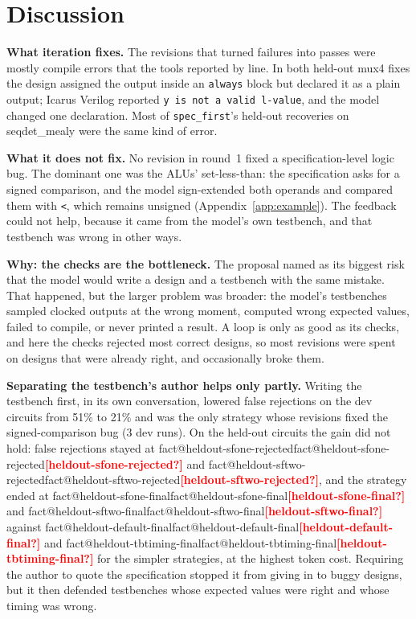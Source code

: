 \documentclass[11pt,a4paper]{article}
\makeatletter
\newcommand{\fact}[1]{\ifcsname fact@#1\endcsname\csname fact@#1\endcsname\else\textcolor{red}{\textbf{[#1?]}}\fi}
\makeatother
\begin{document}
\section{Discussion}\label{sec:discussion}

\textbf{What iteration fixes.} The revisions that turned failures into passes were mostly compile errors that the
tools reported by line. In both held-out mux4 fixes the design assigned the output inside an \texttt{always} block
but declared it as a plain output; Icarus Verilog reported \texttt{y is not a valid l-value}, and the model changed
one declaration. Most of \texttt{spec\_first}'s held-out recoveries on seqdet\_mealy were the same kind of error.

\textbf{What it does not fix.} No revision in round~1 fixed a specification-level logic bug. The dominant one was the
ALUs' set-less-than: the specification asks for a signed comparison, and the model sign-extended both operands and
compared them with \texttt{<}, which remains unsigned (Appendix~\ref{app:example}). The feedback could not help,
because it came from the model's own testbench, and that testbench was wrong in other ways.

\textbf{Why: the checks are the bottleneck.} The proposal named as its biggest risk that the model would write a
design and a testbench with the same mistake. That happened, but the larger problem was broader: the model's
testbenches sampled clocked outputs at the wrong moment, computed wrong expected values, failed to compile, or never
printed a result. A loop is only as good as its checks, and here the checks rejected most correct designs, so most
revisions were spent on designs that were already right, and occasionally broke them.

\textbf{Separating the testbench's author helps only partly.} Writing the testbench first, in its own conversation,
lowered false rejections on the dev circuits from 51\% to 21\% and was the only strategy whose revisions fixed the
signed-comparison bug (3 dev runs). On the held-out circuits the gain did not hold: false rejections stayed at
\fact{heldout-sfone-rejected} and \fact{heldout-sftwo-rejected}, and the strategy ended at
\fact{heldout-sfone-final} and \fact{heldout-sftwo-final} against \fact{heldout-default-final} and
\fact{heldout-tbtiming-final} for the simpler strategies, at the highest token cost. Requiring the author to quote
the specification stopped it from giving in to buggy designs, but it then defended testbenches whose expected values
were right and whose timing was wrong.
\end{document}
